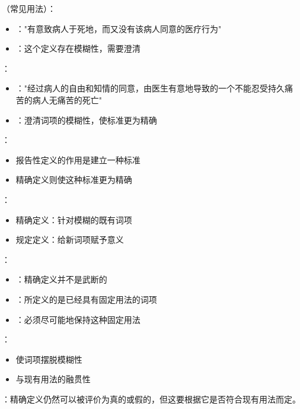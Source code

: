 \begin{examplebox}[title="安乐死"的定义演进]
（常见用法）：
\begin{itemize}
  \item {}："有意致病人于死地，而又没有该病人同意的医疗行为"
  \item {}：这个定义存在模糊性，需要澄清
\end{itemize}

：
\begin{itemize}
  \item {}："经过病人的自由和知情的同意，由医生有意地导致的一个不能忍受持久痛苦的病人无痛苦的死亡"
  \item {}：澄清词项的模糊性，使标准更为精确
\end{itemize}

：
\begin{itemize}
  \item 报告性定义的作用是建立一种标准
  \item 精确定义则使这种标准更为精确
\end{itemize}
\end{examplebox}

\begin{theorembox}[title=精确定义的特殊性质]
：
\begin{itemize}
  \item 精确定义：针对模糊的既有词项
  \item 规定定义：给新词项赋予意义
\end{itemize}

：
\begin{itemize}
  \item {}：精确定义并不是武断的
  \item {}：所定义的是已经具有固定用法的词项
  \item {}：必须尽可能地保持这种固定用法
\end{itemize}

：
\begin{itemize}
  \item 使词项摆脱模糊性
  \item 与现有用法的融贯性
\end{itemize}

：精确定义仍然可以被评价为真的或假的，但这要根据它是否符合现有用法而定。
\end{theorembox}

